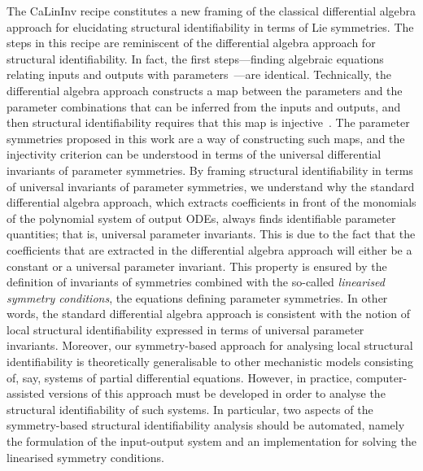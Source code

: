 \documentclass[12pt]{article}
\begin{document}
The CaLinInv recipe constitutes a new framing of the classical differential algebra approach for elucidating structural identifiability in terms of Lie symmetries. The steps in this recipe are reminiscent of the differential algebra approach for structural identifiability. In fact, the first steps---finding algebraic equations relating inputs and outputs with parameters~\cite{ljung1994global}---are identical. Technically, the differential algebra approach constructs a map between the parameters and the parameter combinations that can be inferred from the inputs and outputs, and then structural identifiability requires that this map is injective~\cite{rey2023benchmarking}. The parameter symmetries proposed in this work are a way of constructing such maps, and the injectivity criterion can be understood in terms of the universal differential invariants of parameter symmetries. By framing structural identifiability in terms of universal invariants of parameter symmetries, we understand why the standard differential algebra approach, which extracts coefficients in front of the monomials of the polynomial system of output ODEs, always finds identifiable parameter quantities; that is, universal parameter invariants. This is due to the fact that the coefficients that are extracted in the differential algebra approach will either be a constant or a universal parameter invariant. This property is ensured by the definition of invariants of symmetries combined with the so-called \textit{linearised symmetry conditions}, the equations defining parameter symmetries. In other words, the standard differential algebra approach is consistent with the notion of local structural identifiability expressed in terms of universal parameter invariants. Moreover, our symmetry-based approach for analysing local structural identifiability is theoretically generalisable to other mechanistic models consisting of, say, systems of partial differential equations. However, in practice, computer-assisted versions of this approach must be developed in order to analyse the structural identifiability of such systems. In particular, two aspects of the symmetry-based structural identifiability analysis should be automated, namely the formulation of the input-output system and an implementation for solving the linearised symmetry conditions.
\end{document}
